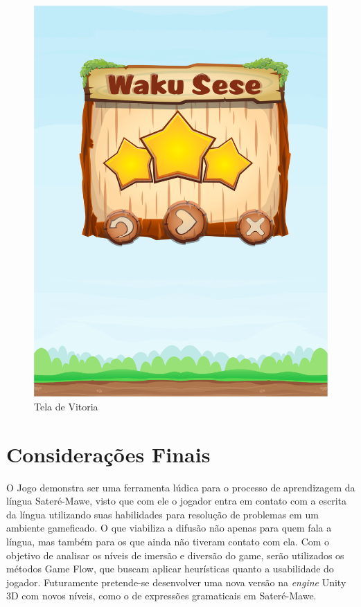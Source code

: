 \documentclass[12pt]{article}
\begin{document}
\begin{figure}[!htb]
			\includegraphics[width=\linewidth]{IMG/vitoria.png}
			\caption{Tela de Vitoria}\label{fig:feed}
			\endminipage
		\end{figure}
		
		
		\section{Considerações Finais}
			O Jogo demonstra ser uma ferramenta lúdica para o processo de aprendizagem da língua Sateré-Mawe, visto que com ele o jogador entra em contato com a escrita da língua utilizando suas habilidades para resolução de problemas em um ambiente gameficado. O que viabiliza a difusão não apenas para quem fala a língua, mas também para os que ainda não tiveram contato com ela. Com o objetivo de analisar os níveis de imersão e diversão do game, serão utilizados os métodos Game Flow, que buscam aplicar heurísticas quanto a usabilidade do jogador. Futuramente pretende-se desenvolver uma nova versão na \textit{engine} Unity 3D com novos níveis, como o de expressões gramaticais em Sateré-Mawe.

	
	
\end{document}

